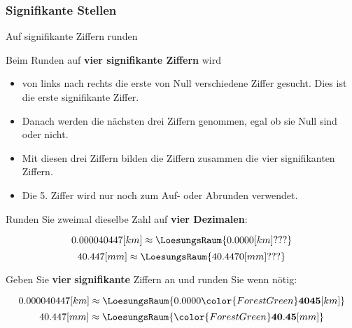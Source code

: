 


\newpage

\subsubsection{Signifikante Stellen}
\begin{rezept}{Auf signifikante Ziffern runden}{}
  
  Beim Runden auf \textbf{vier signifikante Ziffern} wird
  \begin{itemize}
  \item  von links nach rechts die erste von Null verschiedene Ziffer gesucht. Dies ist die
    erste signifikante Ziffer.
  \item
    Danach werden die nächsten drei Ziffern
  genommen, egal ob sie Null sind oder nicht. 
\item   Mit diesen drei Ziffern bilden die Ziffern zusammen die vier
  signifikanten Ziffern.
\item  Die 5. Ziffer wird nur noch zum Auf- oder Abrunden verwendet.
  \end{itemize}
\end{rezept}

Runden Sie zweimal dieselbe Zahl auf \textbf{vier Dezimalen}:
 
$$0.000040447 [km] \approx \LoesungsRaum{0.0000 [km] ???}$$
$$40.447      [mm] \approx \LoesungsRaum{40.4470 [mm] ???}$$

Geben Sie {\color{ForestGreen}\textbf{vier}} \textbf{signifikante} Ziffern an und runden Sie wenn nötig:
 
$$0.000040447 [km] \approx \LoesungsRaum{0.0000{\color{ForestGreen}\mathbf{4045}} [km]}$$
$$40.447      [mm] \approx \LoesungsRaum{{\color{ForestGreen}\mathbf{40.45}} [mm]}$$



